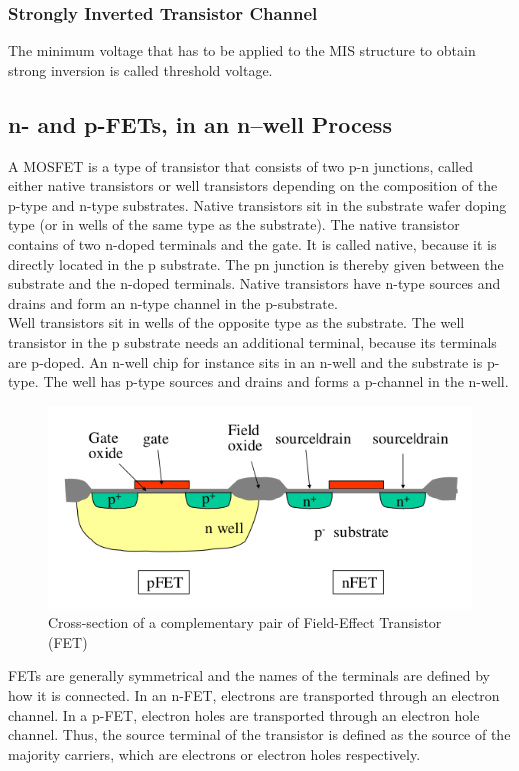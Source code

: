 \documentclass[main]{subfiles}
\begin{document}
\subsubsection{Strongly Inverted Transistor Channel}
The minimum voltage that has to be applied to the MIS structure to obtain
strong inversion is called threshold voltage.

\subsection{n- and p-FETs, in an n–well Process}

A MOSFET is a type of transistor that consists of  two p-n junctions, called either native transistors or well transistors depending on the composition of the p-type and n-type substrates. Native transistors sit in the substrate wafer doping type (or in wells of the same type as the substrate). The native transistor contains of two n-doped terminals and the gate. It is called native, because it is directly located in the p substrate. The pn junction is thereby given between the substrate and the n-doped terminals. Native transistors have n-type sources and drains and form an n-type channel in the p-substrate. \\ Well transistors sit in wells of the opposite type as the substrate. The well transistor in the p substrate needs an additional terminal, because its terminals are p-doped. An n-well chip for instance sits in an n-well and the substrate is p-type.  The well has p-type sources and drains and forms a p-channel in the n-well.
\begin{figure}[H]
\centering
\includegraphics[width=0.6\linewidth]{figs/Field-effect-transistors.png}
\caption{Cross-section of a complementary pair of Field-Effect Transistor (FET)}
\label{field-effect transistor}
\end{figure}

FETs are generally symmetrical and the names of the terminals are defined by how it is connected. In an n-FET, electrons are transported through an electron channel. In a p-FET, electron holes are transported through an electron hole channel. Thus, the source terminal of the transistor is defined as the source of the majority carriers, which are electrons or electron holes respectively.\\
\end{document}

